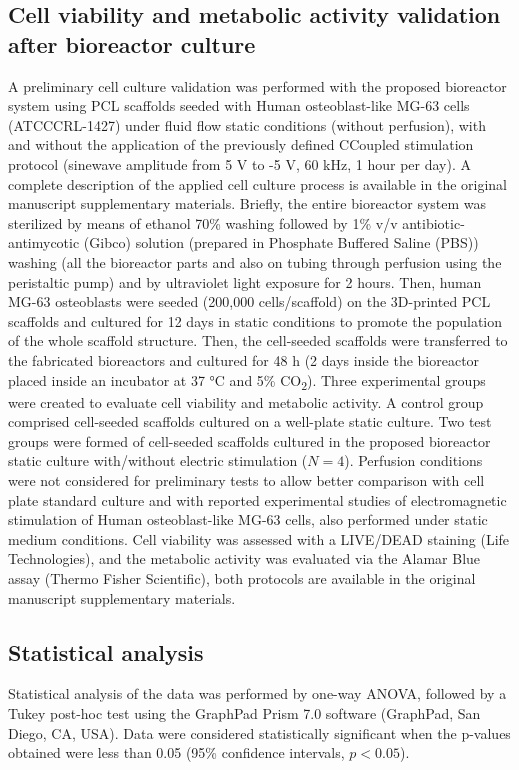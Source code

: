 \subsection{Cell viability and metabolic activity validation after bioreactor culture}
A preliminary cell culture validation was performed with the proposed bioreactor system using \acs{PCL} scaffolds seeded with Human osteoblast-like MG-63 cells (ATCC\textregistered CRL-1427\texttrademark) under fluid flow static conditions (without perfusion), with and without the application of the previously defined CCoupled stimulation protocol (sinewave amplitude from 5 \si{\volt} to -5 \si{\volt}, 60 \si{\kilo\hertz}, 1 hour per day). A complete description of the applied cell culture process is available in the original manuscript supplementary materials. Briefly, the entire bioreactor system was sterilized by means of ethanol 70\% washing followed by 1\% v/v antibiotic-antimycotic (Gibco\texttrademark) solution (prepared in Phosphate Buffered Saline (PBS)) washing (all the bioreactor parts and also on tubing through perfusion using the peristaltic pump) and by ultraviolet light exposure for 2 hours. Then, human MG-63 osteoblasts were seeded (200,000 cells/scaffold) on the 3D-printed \acs{PCL} scaffolds and cultured for 12 days in static conditions to promote the population of the whole scaffold structure. Then, the cell-seeded scaffolds were transferred to the fabricated bioreactors and cultured for 48 \si{\hour} (2 days inside the bioreactor placed inside an incubator at 37 \si{\celsius} and 5\% CO\textsubscript{2}). Three experimental groups were created to evaluate cell viability and metabolic activity. A control group comprised cell-seeded scaffolds cultured on a well-plate static culture. Two test groups were formed of cell-seeded scaffolds cultured in the proposed bioreactor static culture with/without electric stimulation ($N=4$). Perfusion conditions were not considered for preliminary tests to allow better comparison with cell plate standard culture and with reported experimental studies of electromagnetic stimulation of Human osteoblast-like MG-63 cells, also performed under static medium conditions. Cell viability was assessed with a LIVE/DEAD staining (Life Technologies), and the metabolic activity was evaluated via the Alamar Blue assay (Thermo Fisher Scientific), both protocols are available in the original manuscript supplementary materials. 


\subsection{Statistical analysis}
Statistical analysis of the data was performed by one-way ANOVA, followed by a Tukey post-hoc test using the GraphPad Prism 7.0 software (GraphPad, San Diego, CA, USA). Data were considered statistically significant when the p-values obtained were less than 0.05 (95\si{\percent} confidence intervals, $p<0.05$). 


